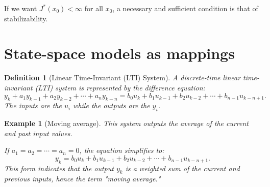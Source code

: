 \documentclass[a4 paper]{article}
\numberwithin{equation}{section}
\theoremstyle{boldStyle}
\theoremstyle{boldBlueStyle}
\theoremstyle{boldPurpleStyle}
\theoremstyle{boldRedStyle}
\newtheorem{definition}{Definition}[section]
\theoremstyle{boldGreenStyle}
\newtheorem{example}{Example}[section]
\begin{document}
If we want \( J^*(x_0) < \infty \) for all \( x_0 \), a necessary and sufficient condition is that of stabilizability.











\newpage
\section{State-space models as mappings}


\begin{definition}[Linear Time-Invariant (LTI) System]
  A discrete-time linear time-invariant (LTI) system is represented by the difference equation:
  \[
  y_k + a_1 y_{k-1} + a_2 y_{k-2} + \cdots + a_n y_{k-n} = b_0 u_k + b_1 u_{k-1} + b_2 u_{k-2} + \cdots + b_{n-1} u_{k-n+1}.
  \]
  The inputs are the \( u_i \) while the outputs are the \( y_i \).
\end{definition}



\begin{example}[Moving average]
  This system outputs the average of the current and past input values. 
  
  If \( a_1 = a_2 = \cdots = a_n = 0 \), the equation simplifies to:
  \[
  y_k = b_0 u_k + b_1 u_{k-1} + b_2 u_{k-2} + \cdots + b_{n-1} u_{k-n+1}.
  \]
  This form indicates that the output \( y_k \) is a weighted sum of the current and previous inputs, hence the term "moving average."
\end{example}
  
\end{document}
